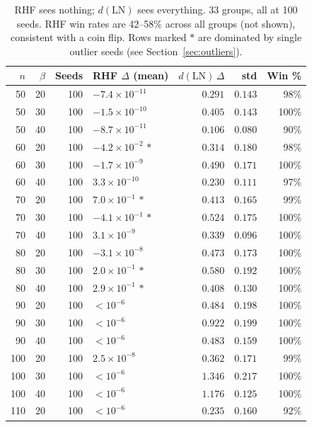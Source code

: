 \documentclass[journal=cic,version=preprint]{iacrj}
\begin{document}
\begin{table}[tbp]
\centering
\caption{RHF sees nothing; $d(\mathrm{LN})$ sees everything. 33 groups, all at 100 seeds. RHF win rates are 42--58\% across all groups (not shown), consistent with a coin flip. Rows marked $\ast$ are dominated by single outlier seeds (see Section~\ref{sec:outliers}).\label{tab:main}}
\small
\begin{tabular}{rrrlrrr}
\hline
$n$ & $\beta$ & Seeds & RHF $\Delta$ (mean) & $d(\mathrm{LN})\,\Delta$ & std & Win \% \\
\hline
50  & 20 & 100 & $-7.4\times 10^{-11}$ & $0.291$  & $0.143$ & 98\% \\
50  & 30 & 100 & $-1.5\times 10^{-10}$ & $0.405$  & $0.143$ & 100\% \\
50  & 40 & 100 & $-8.7\times 10^{-11}$ & $0.106$  & $0.080$ & 90\% \\
60  & 20 & 100 & $-4.2\times 10^{-2}\,\ast$ & $0.314$ & $0.180$ & 98\% \\
60  & 30 & 100 & $-1.7\times 10^{-9}$  & $0.490$  & $0.171$ & 100\% \\
60  & 40 & 100 & $3.3\times 10^{-10}$  & $0.230$  & $0.111$ & 97\% \\
70  & 20 & 100 & $7.0\times 10^{-1}\,\ast$ & $0.413$  & $0.165$ & 99\% \\
70  & 30 & 100 & $-4.1\times 10^{-1}\,\ast$ & $0.524$  & $0.175$ & 100\% \\
70  & 40 & 100 & $3.1\times 10^{-9}$   & $0.339$  & $0.096$ & 100\% \\
80  & 20 & 100 & $-3.1\times 10^{-8}$  & $0.473$  & $0.173$ & 100\% \\
80  & 30 & 100 & $2.0\times 10^{-1}\,\ast$  & $0.580$  & $0.192$ & 100\% \\
80  & 40 & 100 & $2.9\times 10^{-1}\,\ast$  & $0.408$  & $0.130$ & 100\% \\
90  & 20 & 100 & $<10^{-6}$ & $0.484$  & $0.198$ & 100\% \\
90  & 30 & 100 & $<10^{-6}$ & $0.922$  & $0.199$ & 100\% \\
90  & 40 & 100 & $<10^{-6}$ & $0.483$  & $0.159$ & 100\% \\
100 & 20 & 100 & $2.5\times 10^{-8}$   & $0.362$  & $0.171$ & 99\% \\
100 & 30 & 100 & $<10^{-6}$ & $1.346$  & $0.217$ & 100\% \\
100 & 40 & 100 & $<10^{-6}$ & $1.176$  & $0.125$ & 100\% \\
110 & 20 & 100 & $<10^{-6}$ & $0.235$  & $0.160$ & 92\% \\

\end{tabular}
\end{table}
\end{document}
